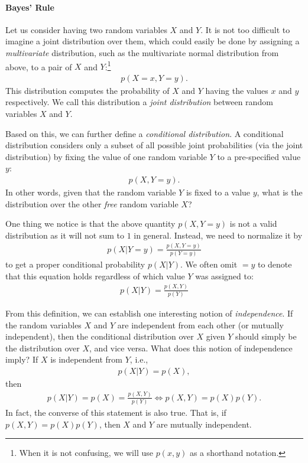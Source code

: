 \documentclass{report}
\begin{document}
\paragraph{Bayes' Rule}

Let us consider having two random variables $X$ and $Y$. It is not too difficult
to imagine a joint distribution over them, which could easily be done by
assigning a {\it multivariate} distribution, such as the multivariate normal
distribution from above, to a pair of $X$ and $Y$:\footnote{
    When it is not confusing, we will use $p(x,y)$ as a shorthand notation.
}
\begin{align*}
    p(X=x, Y=y).
\end{align*}
This distribution computes the probability of $X$ and $Y$ having the values $x$
and $y$ respectively. We call this distribution a {\it joint distribution}
between random variables $X$ and $Y$.

Based on this, we can further define a {\it conditional distribution}. A
conditional distribution considers only a subset of all possible joint
probabilities (via the joint distribution) by fixing the value of one random
variable $Y$ to a pre-specified value $y$:
\begin{align*}
    p(X, Y=y).
\end{align*}
In other words, given that the random variable $Y$ is fixed to a value $y$, what
is the distribution over the other {\it free} random variable $X$?

One thing we notice is that the above quantity $p(X, Y=y)$ is not a valid
distribution as it will not sum to $1$ in general. Instead, we need to normalize
it by 
\begin{align*}
    p(X|Y=y) = \frac{p(X, Y=y)}{p(Y=y)}
\end{align*}
to get a proper conditional probability $p(X|Y)$. We often omit $=y$ to denote
that this equation holds regardless of which value $Y$ was assigned to:
\begin{align}
    \label{eq:condprob}
    p(X|Y) = \frac{p(X, Y)}{p(Y)}
\end{align}

From this definition, we can establish one interesting notion of {\it
independence}. If the random variables $X$ and $Y$ are independent from each
other (or mutually independent), then the conditional distribution over $X$
given $Y$ should simply be the distribution over $X$, and vice versa. What does
this notion of independence imply?
If $X$ is independent from $Y$, i.e.,
\begin{align*}
    p(X|Y) = p(X),
\end{align*}
then
\begin{align*}
    p(X|Y) = p(X) = \frac{p(X, Y)}{p(Y)} 
    \iff p(X, Y) = p(X)p(Y).
\end{align*}
In fact, the converse of this statement is also true. That is, if $p(X, Y) =
p(X)p(Y)$, then $X$ and $Y$ are mutually independent.   
\end{document}
